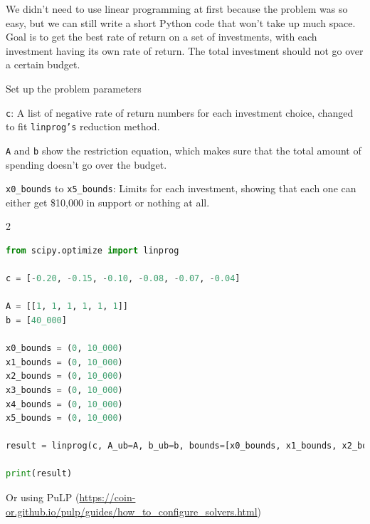 \documentclass[12pt]{article}
\begin{document}
We didn't need to use linear programming at first because the problem was so easy, but we can still write a short Python code that won't take up much space. Goal is to get the best rate of return on a set of investments, with each investment having its own rate of return. The total investment should not go over a certain budget.

Set up the problem parameters

\texttt{c}: A list of negative rate of return numbers for each investment choice, changed to fit \texttt{linprog's} reduction method.

\texttt{A} and \texttt{b} show the restriction equation, which makes sure that the total amount of spending doesn't go over the budget.

\texttt{x0\_bounds} to \texttt{x5\_bounds}: Limits for each investment, showing that each one can either get \$10,000 in support or nothing at all.


\begin{multicols}{2}
\begin{lstlisting}[language=Python]
from scipy.optimize import linprog

c = [-0.20, -0.15, -0.10, -0.08, -0.07, -0.04]

A = [[1, 1, 1, 1, 1, 1]]
b = [40_000]

x0_bounds = (0, 10_000)
x1_bounds = (0, 10_000)
x2_bounds = (0, 10_000)
x3_bounds = (0, 10_000)
x4_bounds = (0, 10_000)
x5_bounds = (0, 10_000)

result = linprog(c, A_ub=A, b_ub=b, bounds=[x0_bounds, x1_bounds, x2_bounds, x3_bounds, x4_bounds, x5_bounds], method='highs')

print(result)
\end{lstlisting}
\end{multicols}

Or using PuLP (\url{https://coin-or.github.io/pulp/guides/how_to_configure_solvers.html})
\end{document}
